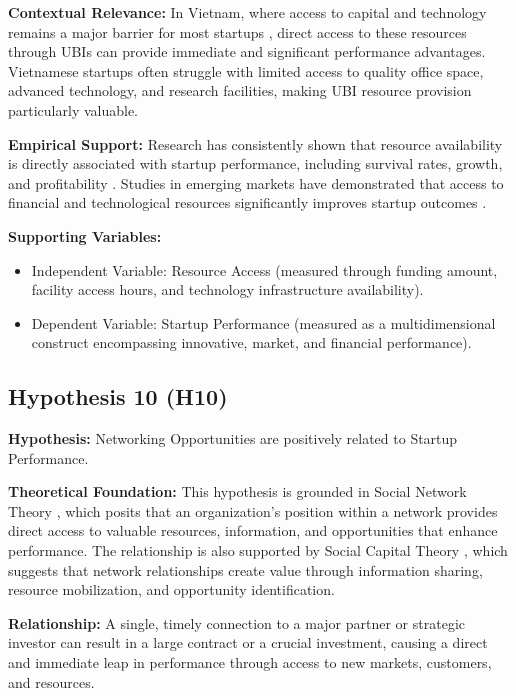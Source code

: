 \documentclass[../Main.tex]{subfiles}
\begin{document}
    \textbf{Contextual Relevance:} In Vietnam, where access to capital and technology remains a major barrier for most startups \cite{vietnam_innovation_report_2024}, direct access to these resources through UBIs can provide immediate and significant performance advantages. Vietnamese startups often struggle with limited access to quality office space, advanced technology, and research facilities, making UBI resource provision particularly valuable.
    
    \textbf{Empirical Support:} Research has consistently shown that resource availability is directly associated with startup performance, including survival rates, growth, and profitability \cite{cooper1994initial}. Studies in emerging markets have demonstrated that access to financial and technological resources significantly improves startup outcomes \cite{bruton2010governance}.
    
    \textbf{Supporting Variables:}
    \begin{itemize}
        \item Independent Variable: Resource Access (measured through funding amount, facility access hours, and technology infrastructure availability).
        \item Dependent Variable: Startup Performance (measured as a multidimensional construct encompassing innovative, market, and financial performance).
    \end{itemize}

    \subsection{Hypothesis 10 (H10)}
    \textbf{Hypothesis:} Networking Opportunities are positively related to Startup Performance.
    
    \textbf{Theoretical Foundation:} This hypothesis is grounded in Social Network Theory \cite{granovetter1973strength}, which posits that an organization's position within a network provides direct access to valuable resources, information, and opportunities that enhance performance. The relationship is also supported by Social Capital Theory \cite{coleman1988social}, which suggests that network relationships create value through information sharing, resource mobilization, and opportunity identification.
    
    \textbf{Relationship:} A single, timely connection to a major partner or strategic investor can result in a large contract or a crucial investment, causing a direct and immediate leap in performance through access to new markets, customers, and resources.
    
\end{document}
